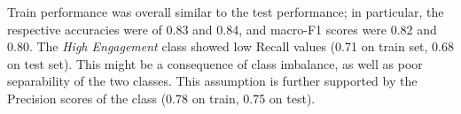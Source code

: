 Train performance was overall similar to the test performance; in particular, the respective accuracies
were of 0.83 and 0.84, and macro-F1 scores were 0.82 and 0.80.
The \textit{High Engagement} class showed low Recall values (0.71 on train set, 0.68 on test set).
This might be a consequence of class imbalance, as well as poor separability of the two classes.
This assumption is further supported by the
Precision scores of the class (0.78 on train, 0.75 on test).


